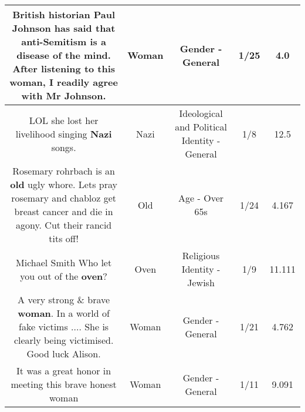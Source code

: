 \documentclass[11pt]{article}
\newlength\mylength
\begin{document}
\begin{center}
\begin{longtable}{|C{.65\mylength}|C{.30\mylength}|C{.12\mylength}|C{.12\mylength}|C{.12\mylength}|}
  \small British historian Paul Johnson has said that anti-Semitism is a disease of the mind.  After listening to this \textbf{woman}, I readily agree with Mr Johnson.\normalsize   & Woman & Gender - General & 1/25 & 4.0 \\  \hline
  \small LOL she lost her livelihood singing \textbf{Nazi} songs.\normalsize   & Nazi &  Ideological and Political Identity - General & 1/8 & 12.5 \\  \hline
  \small Rosemary  rohrbach is an \textbf{old} ugly whore.   Lets pray rosemary and chabloz get breast cancer and die in agony.  Cut their rancid tits off!\normalsize   & Old & Age - Over 65s & 1/24 & 4.167 \\  \hline
  \small Michael Smith Who let you out of the \textbf{oven}?\normalsize   & Oven & Religious Identity - Jewish & 1/9 & 11.111 \\  \hline
  \small A very strong \& brave \textbf{woman}. In a world of fake victims .... She is clearly being victimised. Good luck Alison.\normalsize   & Woman & Gender - General & 1/21 & 4.762 \\  \hline
  \small It was a great honor in meeting this brave honest woman\normalsize   & Woman & Gender - General & 1/11 & 9.091 \\  \hline

\end{longtable}
\end{center}
\end{document}
